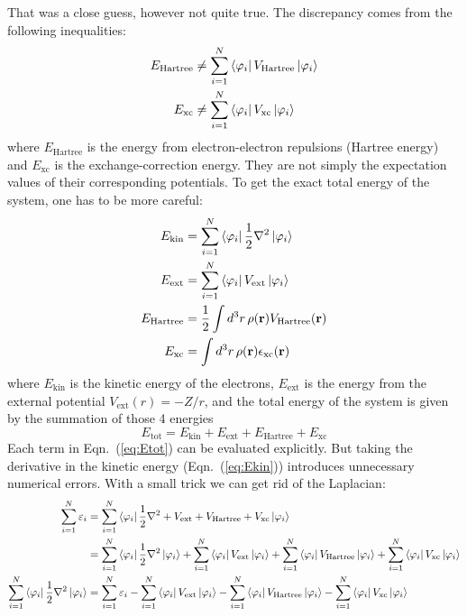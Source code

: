 That was a close guess, however not quite true. The discrepancy comes from
the following inequalities:
\begin{align}
E_\text{Hartree} & \ne \sum_{i=1}^N{\Bra{\varphi_i} V_\text{Hartree} \Ket{\varphi_i}} \label{eq:discp1} \\
E_\text{xc} & \ne \sum_{i=1}^N{\Bra{\varphi_i} V_\text{xc} \Ket{\varphi_i}} \label{eq:discp2}
\end{align}
where $E_\text{Hartree}$ is the energy from electron-electron repulsions
(Hartree energy) and $E_\text{xc}$ is the exchange-correction energy.
They are not simply the expectation values of their corresponding potentials.
To get the exact total energy of the system, one has to be more careful:
\begin{align}
E_\text{kin} & = \sum_{i=1}^N{\Bra{\varphi_i} \frac{1}{2}\nabla^2 \Ket{\varphi_i}} \label{eq:Ekin} \\
E_\text{ext} & = \sum_{i=1}^N{\Bra{\varphi_i} V_\text{ext} \Ket{\varphi_i}} \label{eq:Eext} \\
E_\text{Hartree} & =  \frac{1}{2}\int d^3r\, \rho(\vec{r})V_\text{Hartree}(\vec{r}) \label{eq:EH} \\
E_\text{xc} & =  \int d^3r\, \rho(\vec{r})\epsilon_\text{xc}(\vec{r}) \label{eq:Exc'}
\end{align}
where $E_\text{kin}$ is the kinetic energy of the electrons, $E_\text{ext}$
is the energy from the external potential $V_\text{ext}(r)=-Z/r$, and the
total energy of the system is given by the summation of those 4 energies
\begin{equation} \label{eq:Etot}
E_\text{tot} = E_\text{kin} + E_\text{ext} + E_\text{Hartree} + E_\text{xc}
\end{equation}
Each term in Eqn.~(\ref{eq:Etot}) can be evaluated explicitly. But taking the derivative
in the kinetic energy (Eqn.~(\ref{eq:Ekin})) introduces unnecessary numerical errors. With a small trick we
can get rid of the Laplacian:
\begin{align} \label{eq:Elap}
\sum_{i=1}^N{\varepsilon_i} & = \sum_{i=1}^N{\Bra{\varphi_i} \frac{1}{2}\nabla^2 + V_\text{ext} + V_\text{Hartree} + V_\text{xc} \Ket{\varphi_i}} \\
 & = \sum_{i=1}^N{\Bra{\varphi_i} \frac{1}{2}\nabla^2 \Ket{\varphi_i}} + \sum_{i=1}^N{\Bra{\varphi_i} V_\text{ext} \Ket{\varphi_i}} + \sum_{i=1}^N{\Bra{\varphi_i} V_\text{Hartree} \Ket{\varphi_i}} + \sum_{i=1}^N{\Bra{\varphi_i} V_\text{xc} \Ket{\varphi_i}} \nonumber \\
\sum_{i=1}^N{\Bra{\varphi_i} \frac{1}{2}\nabla^2 \Ket{\varphi_i}} & = \sum_{i=1}^N{\varepsilon_i} - \sum_{i=1}^N{\Bra{\varphi_i} V_\text{ext} \Ket{\varphi_i}} - \sum_{i=1}^N{\Bra{\varphi_i} V_\text{Hartree} \Ket{\varphi_i}} - \sum_{i=1}^N{\Bra{\varphi_i} V_\text{xc} \Ket{\varphi_i}}
\end{align}
